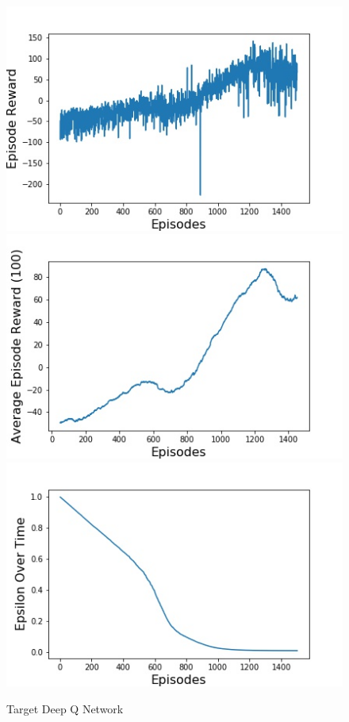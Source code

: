 \documentclass{article}
\begin{document}
\begin{figure}[H]
\centering
\includegraphics[scale=0.25]{rewardOverEpisodesTarget-DQN-NormalMemory}
\includegraphics[scale=0.25]{movingAverageTarget-DQN-NormalMemory}
\includegraphics[scale=0.25]{epsilonTarget-DQN-NormalMemory}
\caption{Target Deep Q Network}
\label{fig:fig3}
\end{figure}
\end{document}
